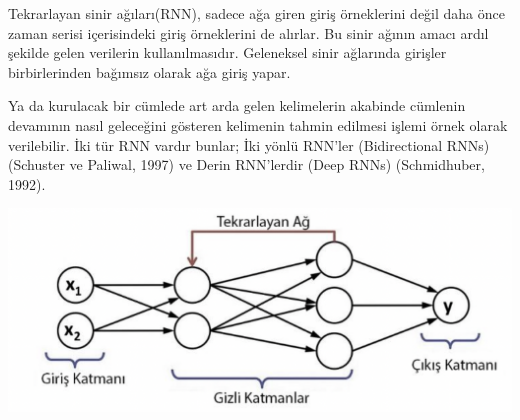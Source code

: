 \documentclass{article}
\begin{document}
\begin{multicols}{2}
Tekrarlayan sinir ağıları(RNN), sadece ağa giren
giriş örneklerini değil daha önce zaman serisi
içerisindeki giriş örneklerini de alırlar. Bu sinir
ağının amacı ardıl şekilde gelen verilerin
kullanılmasıdır. Geleneksel sinir ağlarında
girişler birbirlerinden bağımsız olarak ağa giriş
yapar. 

Ya da kurulacak bir cümlede art arda gelen
kelimelerin akabinde cümlenin devamının nasıl
geleceğini gösteren kelimenin tahmin edilmesi
işlemi örnek olarak verilebilir. İki tür RNN vardır
bunlar; İki yönlü RNN’ler (Bidirectional RNNs)
(Schuster ve Paliwal, 1997) ve Derin RNN’lerdir
(Deep RNNs) (Schmidhuber, 1992).
\vspace{10pt}


\begin{minipage}{\linewidth}
    \includegraphics[width=1\linewidth]{tekrarla.png} 
    \label{fig:Şekil tekrar}
\end{minipage}


\end{multicols}
\end{document}
